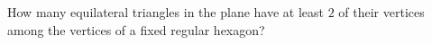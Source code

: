 How many equilateral triangles in the plane have at least $2$ of their vertices among the vertices of a fixed regular hexagon?
